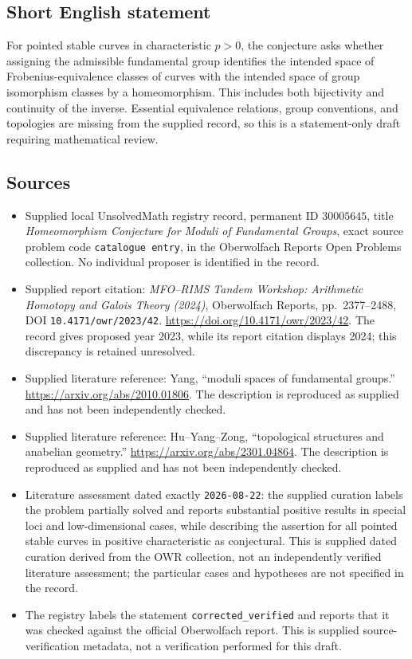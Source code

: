 \documentclass[11pt]{article}
\begin{document}
\subsection{Short English statement}
For pointed stable curves in characteristic \(p>0\), the conjecture asks whether assigning the admissible fundamental group identifies the intended space of Frobenius-equivalence classes of curves with the intended space of group isomorphism classes by a homeomorphism. This includes both bijectivity and continuity of the inverse. Essential equivalence relations, group conventions, and topologies are missing from the supplied record, so this is a statement-only draft requiring mathematical review.
\subsection{Sources}
\begin{itemize}
\item Supplied local UnsolvedMath registry record, permanent ID \(30005645\), title \emph{Homeomorphism Conjecture for Moduli of Fundamental Groups}, exact source problem code \texttt{catalogue entry}, in the Oberwolfach Reports Open Problems collection. No individual proposer is identified in the record.
\item Supplied report citation: \emph{MFO--RIMS Tandem Workshop: Arithmetic Homotopy and Galois Theory (2024)}, Oberwolfach Reports, pp.~2377--2488, DOI \texttt{10.4171/owr/2023/42}. \url{https://doi.org/10.4171/owr/2023/42}. The record gives proposed year 2023, while its report citation displays 2024; this discrepancy is retained unresolved.
\item Supplied literature reference: Yang, ``moduli spaces of fundamental groups.'' \url{https://arxiv.org/abs/2010.01806}. The description is reproduced as supplied and has not been independently checked.
\item Supplied literature reference: Hu--Yang--Zong, ``topological structures and anabelian geometry.'' \url{https://arxiv.org/abs/2301.04864}. The description is reproduced as supplied and has not been independently checked.
\item Literature assessment dated exactly \texttt{2026-08-22}: the supplied curation labels the problem partially solved and reports substantial positive results in special loci and low-dimensional cases, while describing the assertion for all pointed stable curves in positive characteristic as conjectural. This is supplied dated curation derived from the OWR collection, not an independently verified literature assessment; the particular cases and hypotheses are not specified in the record.
\item The registry labels the statement \texttt{corrected\_verified} and reports that it was checked against the official Oberwolfach report. This is supplied source-verification metadata, not a verification performed for this draft.
\end{itemize}
\end{document}
